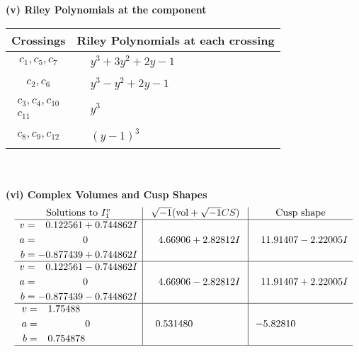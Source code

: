\documentclass[1p]{elsarticle_modified}
\theoremstyle{definition}
\newcommand{\I}{\sqrt{-1}}
\begin{document}
\newpage\renewcommand{\arraystretch}{1}
\flushleft \textbf{(v) Riley Polynomials at the component}\newline \\
\begin{tabular}{m{50pt}|m{274pt}}
Crossings & \hspace{64pt}Riley Polynomials at each crossing \\
\hline $$\begin{aligned}c_{1},c_{5},c_{7}\end{aligned}$$&$\begin{aligned}
&y^3+3 y^2+2 y-1
\end{aligned}$\\
\hline $$\begin{aligned}c_{2},c_{6}\end{aligned}$$&$\begin{aligned}
&y^3- y^2+2 y-1
\end{aligned}$\\
\hline $$\begin{aligned}c_{3},c_{4},c_{10}\\c_{11}\end{aligned}$$&$\begin{aligned}
&y^3
\end{aligned}$\\
\hline $$\begin{aligned}c_{8},c_{9},c_{12}\end{aligned}$$&$\begin{aligned}
&(y-1)^3
\end{aligned}$\\
\hline
\end{tabular}\\~\\
\newpage\flushleft \textbf{(vi) Complex Volumes and Cusp Shapes}
$$\begin{array}{c|c|c}  
\text{Solutions to }I^v_{1}& \I (\text{vol} + \sqrt{-1}CS) & \text{Cusp shape}\\
 \hline 
\begin{aligned}
v &= \phantom{-}0.122561 + 0.744862 I \\
a &= \phantom{-0.000000 } 0 \\
b &= -0.877439 + 0.744862 I\end{aligned}
 & \phantom{-}4.66906 + 2.82812 I & \phantom{-}11.91407 - 2.22005 I \\ \hline\begin{aligned}
v &= \phantom{-}0.122561 - 0.744862 I \\
a &= \phantom{-0.000000 } 0 \\
b &= -0.877439 - 0.744862 I\end{aligned}
 & \phantom{-}4.66906 - 2.82812 I & \phantom{-}11.91407 + 2.22005 I \\ \hline\begin{aligned}
v &= \phantom{-}1.75488\phantom{ +0.000000I} \\
a &= \phantom{-0.000000 } 0 \\
b &= \phantom{-}0.754878\phantom{ +0.000000I}\end{aligned}
 & \phantom{-}0.531480\phantom{ +0.000000I} & -5.82810\phantom{ +0.000000I}\\
 \hline 
 \end{array}$$\newpage
\end{document}
